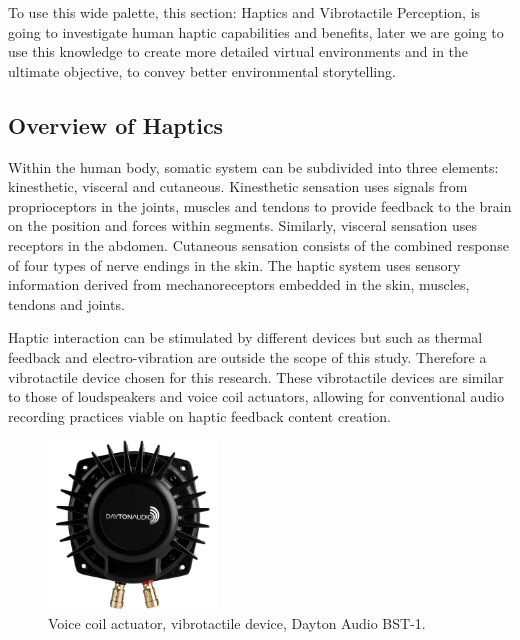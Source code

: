         To use this wide palette, this section: Haptics and Vibrotactile Perception, is going to investigate human haptic capabilities and benefits, later we are going to use this knowledge to create more detailed virtual environments and in the ultimate objective, to convey better environmental storytelling.\par
        \subsection{Overview of Haptics}
            Within the human body, somatic system can be subdivided into three elements: kinesthetic, visceral and cutaneous. Kinesthetic sensation uses signals from proprioceptors in the joints, muscles and tendons to provide feedback to the brain on the position and forces within segments. Similarly, visceral sensation uses receptors in the abdomen. Cutaneous sensation consists of the combined response of four types of nerve endings in the skin\cite{Human_Response_to_Vibration}. The haptic system uses sensory information derived from mechanoreceptors embedded in the skin, muscles, tendons and joints\cite{Haptic_Perception-A_Tutorial}.\par

            Haptic interaction can be stimulated by different devices but such as thermal feedback and electro-vibration are outside the scope of this study. Therefore a vibrotactile device chosen for this research. These vibrotactile devices are similar to those of loudspeakers and voice coil actuators\cite{Audio-Tactile_Rendering}, allowing for conventional audio recording practices viable on haptic feedback content creation.\par

            \begin{figure}[H]
                \centering
                \includegraphics[width=0.4\textwidth]{images/vibrotactile_bass-shaker.jpg}
                \caption{Voice coil actuator, vibrotactile device, Dayton Audio BST-1.}
                \label{fig:VCA}
            \end{figure}

